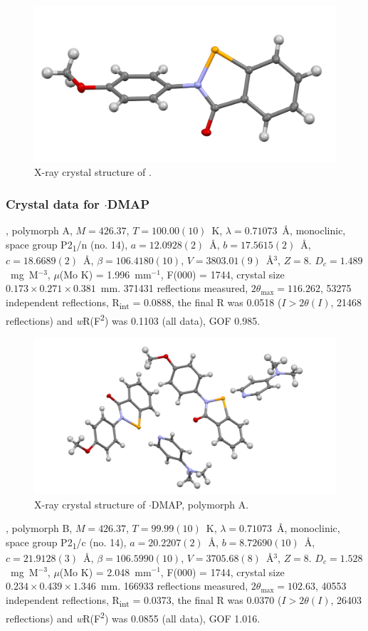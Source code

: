 \begin{refsection}
\begin{figure}
  \includegraphics[width=0.6\linewidth]{Figures/ebs-4ome-xtal.pdf}
  \caption{X-ray crystal structure of \texorpdfstring{}{C14 H11 N O2 Se}.}
\end{figure}

\subsubsection{Crystal data for \texorpdfstring{$ \cdot $DMAP}{C21 H21 N3 O2 Se}}
, polymorph A, $M=426.37$, $T=100.00(10)$~K, $ \lambda=0.71073 $~\AA, monoclinic, space group P2\textsubscript{1}/n (no. 14), $a = 12.0928(2)$~\AA, $b = 17.5615(2)$~\AA, $c = 18.6689(2)$~\AA, $\beta = 106.4180(10)$\degree, $V = 3803.01(9)$~\AA$^{3}$, $Z = 8$. $D_{c}= 1.489$~mg~M$^{-3}$, $\mu$(Mo K\a) = 1.996~mm$^{-1}$, F(000) = 1744, crystal size $0.173 \times 0.271 \times 0.381$~mm. 371431 reflections measured, $2\theta_{\max}=116.262$\degree, 53275 independent reflections, R\textsubscript{int} = 0.0888, the final R was 0.0518 ($I > 2\theta(I)$, 21468 reflections) and \textit{w}R(F\textsuperscript{2}) was 0.1103 (all data), GOF 0.985.

\begin{figure}
  \includegraphics[width=0.6\linewidth]{Figures/ebs-4ome-dmap-a-xtal.pdf}
  \caption{X-ray crystal structure of \texorpdfstring{$ \cdot $DMAP}{C21 H21 N3 O2 Se}, polymorph A.}
\end{figure}

, polymorph B, $M=426.37$, $T=99.99(10)$~K, $ \lambda=0.71073 $~\AA, monoclinic, space group P2\textsubscript{1}/c (no. 14), $a = 20.2207(2)$~\AA, $b = 8.72690(10)$~\AA, $c = 21.9128(3)$~\AA, $\beta = 106.5990(10)$\degree, $V = 3705.68(8)$~\AA$^{3}$, $Z = 8$. $D_{c}= 1.528$~mg~M$^{-3}$, $\mu$(Mo K\a) = 2.048~mm$^{-1}$, F(000) = 1744, crystal size $0.234 \times 0.439 \times 1.346$~mm. 166933 reflections measured, $2\theta_{\max}=102.63$\degree, 40553 independent reflections, R\textsubscript{int} = 0.0373, the final R was 0.0370 ($I > 2\theta(I)$, 26403 reflections) and \textit{w}R(F\textsuperscript{2}) was 0.0855 (all data), GOF 1.016.


\end{refsection}
